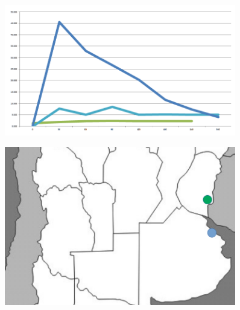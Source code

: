 \documentclass[final]{beamer}
\newlength{\sepwid}
\newlength{\onecolwid}
\begin{document}
\begin{frame}[t]
\begin{columns}[t]
\begin{column}{\onecolwid}
         \end{column}
                  
                  
                  
         \begin{column}{\sepwid}  \end{column}
         
         
         
         
         \begin{column}{\onecolwid} %
         
        
          
          \begin{block}{ }
				\begin{figure}
                	\vspace*{-1cm}
                    \includegraphics[width=.9\linewidth]{plot.PNG}
				\end{figure}
				\begin{figure}
                  \includegraphics[width=.6\linewidth]{ar.png}
				\end{figure}
                

\end{block}
\end{column}
\end{columns}
\end{frame}
\end{document}
